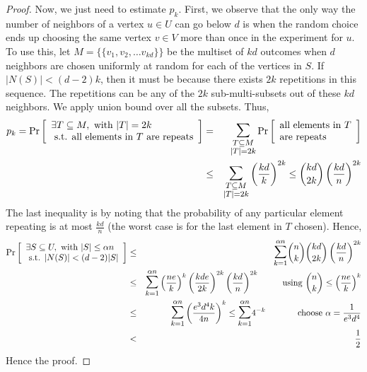 \begin{proof}
Now, we just need to estimate $p_k$. First, we observe that the only way the number of neighbors of a vertex $u \in U$ can go below $d$ is when the random choice ends up choosing the same vertex $v \in V$ more than once in the experiment for $u$. To use this, let $M=\{\{v_1, v_2, \ldots v_{kd}\}\}$ be the multiset of $kd$ outcomes when $d$ neighbors are chosen uniformly at random for each of the vertices in $S$. If $|N(S)| < (d-2)k$, then it must be because there exists $2k$ repetitions in this sequence. The repetitions can be any of the $2k$ sub-multi-subsets out of these $kd$ neighbors. We apply union bound over all the subsets. Thus,
\begin{eqnarray*}
p_k = \Pr\left[\begin{array}{l}
\exists T \subseteq M, \textrm{ with } |T|=2k \\
\textrm{ s.t. all elements in $T$ are repeats}
\end{array}
\right] 
& = & \bigsum_{\substack{{T \subseteq M}\\|T|=2k}}
\Pr\left[\begin{array}{l}
\textrm{all elements in $T$}\\
\textrm{are repeats}
\end{array}
\right] \\
& \le & \bigsum_{\substack{{T \subseteq M}\\|T|=2k}} \left(\frac{kd}{k}\right)^{2k}
\le {kd \choose 2k}\left(\frac{kd}{n}\right)^{2k}
\end{eqnarray*}
The last inequality is by noting that the probability of any particular element repeating is at most $\frac{kd}{n}$ (the worst case is for the last element in $T$ chosen). Hence,
\begin{eqnarray*}
\Pr\left[\begin{array}{l}
\exists S \subseteq U, \textrm{ with } |S|\le \alpha n \\
\textrm{ s.t. } |N(S)| < (d-2)|S|
\end{array}
\right] 
&\le &\bigsum_{k=1}^{\alpha n} {n \choose k}  {kd \choose 2k}\left(\frac{kd}{n}\right)^{2k} \\
& \le & \bigsum_{k=1}^{\alpha n} \left(\frac{ne}{k}\right)^k \left(\frac{kde}{2k}\right)^{2k} \left(\frac{kd}{n}\right)^{2k}
\textrm{~~~~~~~~using ${n \choose k} \le \left(\frac{ne}{k}\right)^k$} \\
& \le & \bigsum_{k=1}^{\alpha n} \left(\frac{e^3d^4k}{4n}\right)^k \le \bigsum_{k=1}^{\alpha n} 4^{-k} \textrm{~~~~~~~~~~~choose $\alpha = \frac{1}{e^3d^4}$} \\
& < & \half
\end{eqnarray*}
Hence the proof.
\end{proof}

